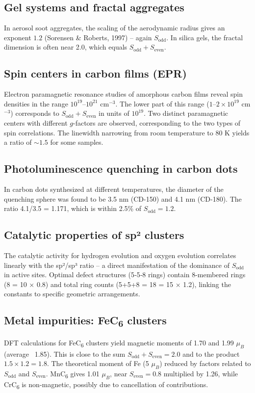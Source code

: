 \documentclass[12pt,a4paper]{article}
\begin{document}
	\subsection{Gel systems and fractal aggregates}
	In aerosol soot aggregates, the scaling of the aerodynamic radius gives an exponent \(1.2\) (Sorensen \& Roberts, 1997) – again \(S_{\text{odd}}\). In silica gels, the fractal dimension is often near 2.0, which equals \(S_{\text{odd}}+S_{\text{even}}\).
	
	\subsection{Spin centers in carbon films (EPR)}
	Electron paramagnetic resonance studies of amorphous carbon films reveal spin densities in the range \(10^{19}\)–\(10^{21}\) cm\(^{-3}\). The lower part of this range (\(1\)–\(2\times10^{19}\) cm\(^{-3}\)) corresponds to \(S_{\text{odd}}+S_{\text{even}}\) in units of \(10^{19}\). Two distinct paramagnetic centers with different \(g\)-factors are observed, corresponding to the two types of spin correlations. The linewidth narrowing from room temperature to 80 K yields a ratio of \(\sim 1.5\) for some samples.
	
	\subsection{Photoluminescence quenching in carbon dots}
	In carbon dots synthesized at different temperatures, the diameter of the quenching sphere was found to be 3.5 nm (CD-150) and 4.1 nm (CD-180). The ratio 4.1/3.5 = 1.171, which is within 2.5\% of \(S_{\text{odd}}=1.2\).
	
	\subsection{Catalytic properties of sp² clusters}
	The catalytic activity for hydrogen evolution and oxygen evolution correlates linearly with the sp²/sp³ ratio – a direct manifestation of the dominance of \(S_{\text{odd}}\) in active sites. Optimal defect structures (5‑5‑8 rings) contain 8-membered rings (8 = 10 × 0.8) and total ring counts (5+5+8 = 18 = 15 × 1.2), linking the constants to specific geometric arrangements.
	
	\subsection{Metal impurities: FeC\textsubscript{6} clusters}
	DFT calculations for FeC\textsubscript{6} clusters yield magnetic moments of 1.70 and 1.99 \(\mu_B\) (average ~1.85). This is close to the sum \(S_{\text{odd}}+S_{\text{even}}=2.0\) and to the product \(1.5\times1.2=1.8\). The theoretical moment of Fe (5 \(\mu_B\)) reduced by factors related to \(S_{\text{odd}}\) and \(S_{\text{even}}\). MnC\textsubscript{6} gives 1.01 \(\mu_B\), near \(S_{\text{even}}=0.8\) multiplied by 1.26, while CrC\textsubscript{6} is non‑magnetic, possibly due to cancellation of contributions.
	
\end{document}
